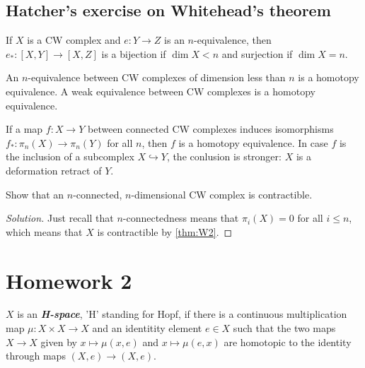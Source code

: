 \subsection{Hatcher's exercise on Whitehead's theorem}
\begin{thm}
	If $X$ is a CW complex and $e:Y\to Z$ is an $n$-equivalence, then $e_*:[X,Y]\to[X,Z]$ is a bijection if $\dim X<n$ and surjection if $\dim X=n$.
\end{thm}
\begin{thm}\label{thm:W2}
	An $n$-equivalence between CW complexes of dimension less than $n$ is a homotopy equivalence. A weak equivalence between CW complexes is a homotopy equivalence.
\end{thm}
\begin{thm}
	If a map $f:X\to Y$ between connected CW complexes induces isomorphisms $f_*:\pi_n(X)\to\pi_n(Y)$ for all $n$, then $f$ is a homotopy equivalence. In case $f$ is the inclusion of a subcomplex $X\hookrightarrow Y$, the conlusion is stronger: $X$ is a deformation retract of $Y$.
\end{thm}
\begin{exercise}[Hatcher 4.1.12]
	Show that an $n$-connected, $n$-dimensional CW complex is contractible.
\end{exercise}
\begin{proof}[Solution]
	Just recall that $n$-connectedness means that $\pi_i(X)=0$ for all $i\leq n$, which means that $X$ is contractible by \cref{thm:W2}.
\end{proof}

\section{Homework 2}
\begin{defn}
	$X$  is an \textit{\textbf{H-space}}, 'H' standing for Hopf, if there is a continuous multiplication map $\mu:X\times X\to X$ and an identitity element $e\in X$  such that the two maps $X\to X$ given by $x\mapsto\mu(x,e)$ and $x\mapsto\mu(e,x)$ are homotopic to the identity through maps $(X,e)\to(X,e)$. 
\end{defn}

